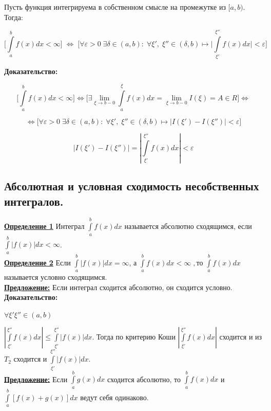 \documentclass[a4paper,12pt]{article} %
\renewcommand {\leq}{\leqslant}
\begin{document}
Пусть функция интегрируема в собственном смысле на промежутке из $[a, b)$. Тогда:

$$\bigl[ \int \limits_a^{b} f(x) dx < \infty \bigr] \; \Leftrightarrow \;  \bigl[\forall \varepsilon > 0\; \exists \delta \in (a, b):\; \forall \xi',\; \xi'' \in (\delta, b) \longmapsto \Bigg|\int\limits_{\xi'}^{\xi''} f(x) dx\Bigg| < \varepsilon \bigr]$$

\textbf{Доказательство:}

$$\bigl[ \int\limits_a^{b} f(x) dx < \infty \bigr] \Longleftrightarrow \bigl[ \exists \lim\limits_{\xi \rightarrow b-0} \int\limits_a^{\xi} f(x) dx = \lim\limits_{\xi \rightarrow b-0} I(\xi) = A \in R \bigr] \Longleftrightarrow$$ 

$$ \Longleftrightarrow \bigl[\forall \varepsilon > 0\; \exists \delta \in (a, b):\; \forall \xi',\; \xi'' \in (\delta, b) \longmapsto |I(\xi') - I(\xi'')| < \varepsilon \bigr]$$

$$\left| I(\xi') - I(\xi'') \right| = \left|\int\limits_{\xi'}^{\xi''} f(x) dx\right| < \varepsilon$$


\subsection{Абсолютная и условная сходимость несобственных интегралов.}

\underline{\textbf{Определение 1}} Интеграл $\int\limits_{a}^{b} f(x) dx$ называется абсолютно сходящимся, если $\int\limits_{a}^{b} |f(x)| dx < \infty$.\\

\underline{\textbf{Определение 2}} Если $\int\limits_{a}^{b} |f(x)| dx = \infty$, а $\int\limits_{a}^{b} f(x) dx < \infty\;  , то$ $\int\limits_{a}^{b} f(x) dx$ называется условно сходящимся.\\

\underline{\textbf{Предложение:}} Если интеграл сходится абсолютно, он сходится условно.\\

\textbf{Доказательство:}

$\forall \xi' \xi'' \in (a, b)$

$ \left|\int\limits_{\xi'}^{\xi''} f(x) dx\right| \leq \int\limits_{\xi'}^{\xi''} |f(x)| dx$. Тогда по критерию Коши
$\left|\int\limits_{\xi'}^{\xi''} f(x) dx\right|$ сходится 
и из $T_2$ сходится и $\int\limits_{\xi'}^{\xi''} |f(x)| dx$.\\



\underline{\textbf{Предложение:}} Если $\int\limits_{a}^{b} g(x) dx$ сходится абсолютно, то $\int\limits_{a}^{b} f(x) dx$ и $\int\limits_{a}^{b} [f(x)+g(x)] dx$ ведут себя одинаково.\\
\end{document}
